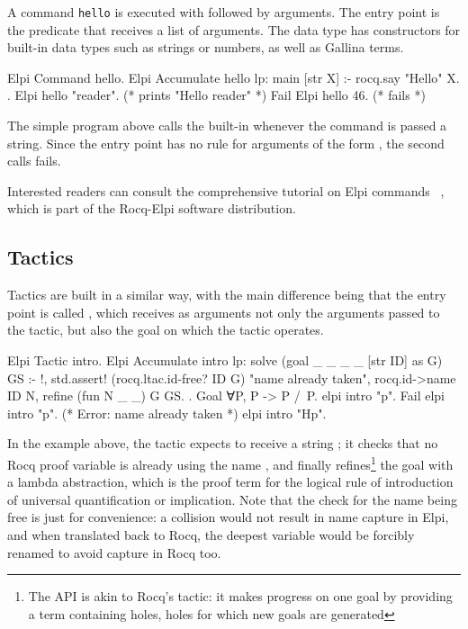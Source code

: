 \documentclass{these-ISSS}
\newenvironment{rocqcode}
  {\VerbatimEnvironment\begin{rocqbox}\begin{xrocqcode}}{\end{xrocqcode}
\end{rocqbox}}
\begin{document}
A command \texttt{hello} is executed with  followed by
arguments. The entry point is the  predicate
that receives a list of arguments. The  data type has constructors for built-in data
types such as strings or numbers, as well as Gallina terms.

\begin{rocqcode}
Elpi Command hello.
Elpi Accumulate hello lp:{{
  main [str X] :- rocq.say "Hello" X.
}}.
Elpi hello "reader".    (* prints "Hello reader" *)
Fail Elpi hello 46.     (* fails *)
\end{rocqcode}

The simple program above calls the  built-in whenever the
command is passed a string. Since the entry point  has no rule for
arguments of the form , the second calls fails.

Interested readers can consult the comprehensive tutorial on Elpi commands
~\cite{tuto:commands}, which is part of the Rocq-Elpi software distribution.

\subsection{Tactics}


Tactics are built in a similar way, with the main difference being that the
entry point is called , which receives as arguments not only the
arguments passed to the tactic, but also the goal on which the tactic
operates.

\begin{rocqcode}
Elpi Tactic intro.
Elpi Accumulate intro lp:{{
  solve (goal _ _ _ _ [str ID] as G) GS :- !,
    std.assert! (rocq.ltac.id-free? ID G) "name already taken",
    rocq.id->name ID N,
    refine (fun N _ _) G GS.
}}.
Goal ∀P, P -> P /\ P.
elpi intro "p".
Fail elpi intro "p". (* Error: name already taken *)
elpi intro "Hp".
\end{rocqcode}


In the example above, the tactic expects to receive a string ; it
checks that no Rocq proof variable is already using the name , and finally
refines\footnote{The  API is akin to Rocq's 
tactic: it makes progress on one goal by
providing a term containing holes, holes for which new goals are generated}
the goal with a lambda abstraction, which is the proof term for the
logical rule of introduction of universal quantification or implication.
Note that the check for the name being free is just for convenience: a
collision would not result in name capture in Elpi, and when translated back
to Rocq, the deepest variable would be forcibly renamed to avoid capture in Rocq too.
\end{document}
